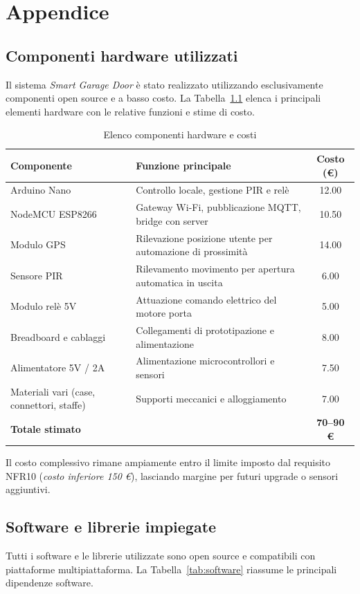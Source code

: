 \chapter{Appendice}

\section{Componenti hardware utilizzati}
Il sistema \textit{Smart Garage Door} è stato realizzato utilizzando esclusivamente componenti open source e a basso costo.
La Tabella~\ref{tab:hardware} elenca i principali elementi hardware con le relative funzioni e stime di costo.

\begin{table}[h!]
\centering
\caption{Elenco componenti hardware e costi}
\label{tab:hardware}
\begin{tabularx}{\textwidth}{@{}lXc@{}}
\toprule
\textbf{Componente} & \textbf{Funzione principale} & \textbf{Costo (€)} \\
\midrule
Arduino Nano & Controllo locale, gestione PIR e relè & 12.00 \\
NodeMCU ESP8266 & Gateway Wi-Fi, pubblicazione MQTT, bridge con server & 10.50 \\
Modulo GPS & Rilevazione posizione utente per automazione di prossimità & 14.00 \\
Sensore PIR & Rilevamento movimento per apertura automatica in uscita & 6.00 \\
Modulo relè 5V & Attuazione comando elettrico del motore porta & 5.00 \\
Breadboard e cablaggi & Collegamenti di prototipazione e alimentazione & 8.00 \\
Alimentatore 5V / 2A & Alimentazione microcontrollori e sensori & 7.50 \\
Materiali vari (case, connettori, staffe) & Supporti meccanici e alloggiamento & 7.00 \\
\midrule
\textbf{Totale stimato} & & \textbf{70–90 €} \\
\bottomrule
\end{tabularx}
\end{table}

Il costo complessivo rimane ampiamente entro il limite imposto dal requisito NFR10 (\textit{costo inferiore 150 €}), lasciando margine per futuri upgrade o sensori aggiuntivi.

\section{Software e librerie impiegate}
Tutti i software e le librerie utilizzate sono open source e compatibili con piattaforme multipiattaforma.
La Tabella~\ref{tab:software} riassume le principali dipendenze software.


